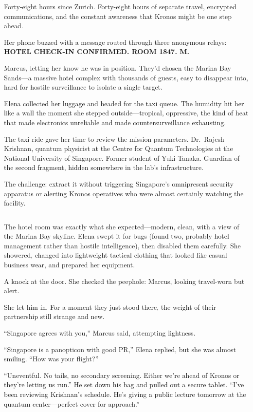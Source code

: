 \documentclass[12pt,letterpaper]{book}
\begin{document}
Forty-eight hours since Zurich. Forty-eight hours of separate travel, encrypted communications, and the constant awareness that Kronos might be one step ahead.

Her phone buzzed with a message routed through three anonymous relays: \textbf{HOTEL CHECK-IN CONFIRMED. ROOM 1847. M.}

Marcus, letting her know he was in position. They'd chosen the Marina Bay Sands---a massive hotel complex with thousands of guests, easy to disappear into, hard for hostile surveillance to isolate a single target.

Elena collected her luggage and headed for the taxi queue. The humidity hit her like a wall the moment she stepped outside---tropical, oppressive, the kind of heat that made electronics unreliable and made countersurveillance exhausting.

The taxi ride gave her time to review the mission parameters. Dr.~Rajesh Krishnan, quantum physicist at the Centre for Quantum Technologies at the National University of Singapore. Former student of Yuki Tanaka. Guardian of the second fragment, hidden somewhere in the lab's infrastructure.

The challenge: extract it without triggering Singapore's omnipresent security apparatus or alerting Kronos operatives who were almost certainly watching the facility.

\begin{center}\rule{0.5\linewidth}{0.5pt}\end{center}

The hotel room was exactly what she expected---modern, clean, with a view of the Marina Bay skyline. Elena swept it for bugs (found two, probably hotel management rather than hostile intelligence), then disabled them carefully. She showered, changed into lightweight tactical clothing that looked like casual business wear, and prepared her equipment.

A knock at the door. She checked the peephole: Marcus, looking travel-worn but alert.

She let him in. For a moment they just stood there, the weight of their partnership still strange and new.

``Singapore agrees with you,'' Marcus said, attempting lightness.

``Singapore is a panopticon with good PR,'' Elena replied, but she was almost smiling. ``How was your flight?''

``Uneventful. No tails, no secondary screening. Either we're ahead of Kronos or they're letting us run.'' He set down his bag and pulled out a secure tablet. ``I've been reviewing Krishnan's schedule. He's giving a public lecture tomorrow at the quantum center---perfect cover for approach.''
\end{document}
